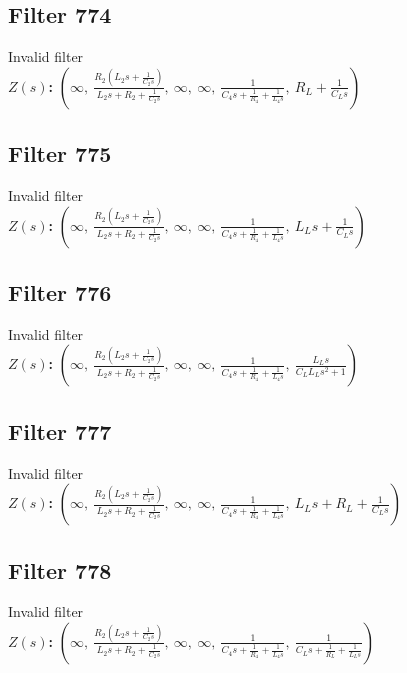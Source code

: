 \documentclass{article}
\begin{document}
\subsection*{Filter 774}
Invalid filter \\ 
\textbf{$Z(s)$:} $\left( \infty, \  \frac{R_{2} \left(L_{2} s + \frac{1}{C_{2} s}\right)}{L_{2} s + R_{2} + \frac{1}{C_{2} s}}, \  \infty, \  \infty, \  \frac{1}{C_{4} s + \frac{1}{R_{4}} + \frac{1}{L_{4} s}}, \  R_{L} + \frac{1}{C_{L} s}\right)$ \\ 
\subsection*{Filter 775}
Invalid filter \\ 
\textbf{$Z(s)$:} $\left( \infty, \  \frac{R_{2} \left(L_{2} s + \frac{1}{C_{2} s}\right)}{L_{2} s + R_{2} + \frac{1}{C_{2} s}}, \  \infty, \  \infty, \  \frac{1}{C_{4} s + \frac{1}{R_{4}} + \frac{1}{L_{4} s}}, \  L_{L} s + \frac{1}{C_{L} s}\right)$ \\ 
\subsection*{Filter 776}
Invalid filter \\ 
\textbf{$Z(s)$:} $\left( \infty, \  \frac{R_{2} \left(L_{2} s + \frac{1}{C_{2} s}\right)}{L_{2} s + R_{2} + \frac{1}{C_{2} s}}, \  \infty, \  \infty, \  \frac{1}{C_{4} s + \frac{1}{R_{4}} + \frac{1}{L_{4} s}}, \  \frac{L_{L} s}{C_{L} L_{L} s^{2} + 1}\right)$ \\ 
\subsection*{Filter 777}
Invalid filter \\ 
\textbf{$Z(s)$:} $\left( \infty, \  \frac{R_{2} \left(L_{2} s + \frac{1}{C_{2} s}\right)}{L_{2} s + R_{2} + \frac{1}{C_{2} s}}, \  \infty, \  \infty, \  \frac{1}{C_{4} s + \frac{1}{R_{4}} + \frac{1}{L_{4} s}}, \  L_{L} s + R_{L} + \frac{1}{C_{L} s}\right)$ \\ 
\subsection*{Filter 778}
Invalid filter \\ 
\textbf{$Z(s)$:} $\left( \infty, \  \frac{R_{2} \left(L_{2} s + \frac{1}{C_{2} s}\right)}{L_{2} s + R_{2} + \frac{1}{C_{2} s}}, \  \infty, \  \infty, \  \frac{1}{C_{4} s + \frac{1}{R_{4}} + \frac{1}{L_{4} s}}, \  \frac{1}{C_{L} s + \frac{1}{R_{L}} + \frac{1}{L_{L} s}}\right)$ \\ 
\end{document}
